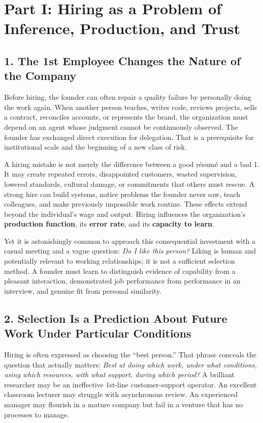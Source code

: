 \section*{Part I: Hiring as a Problem of Inference, Production, and Trust}

\subsection*{1. The 1st Employee Changes the Nature of the Company}

Before hiring, the founder can often repair a quality failure by personally doing the work again. When another person teaches, writes code, reviews projects, sells a contract, reconciles accounts, or represents the brand, the organization must depend on an agent whose judgment cannot be continuously observed. The founder has exchanged direct execution for delegation. That is a prerequisite for institutional scale and the beginning of a new class of risk.

A hiring mistake is not merely the difference between a good résumé and a bad 1. It may create repeated errors, disappointed customers, wasted supervision, lowered standards, cultural damage, or commitments that others must rescue. A strong hire can build systems, notice problems the founder never saw, teach colleagues, and make previously impossible work routine. These effects extend beyond the individual's wage and output. Hiring influences the organization's \textbf{production function}, its \textbf{error rate}, and its \textbf{capacity to learn}.

Yet it is astonishingly common to approach this consequential investment with a casual meeting and a vague question: \textit{Do I like this person?} Liking is human and potentially relevant to working relationships; it is not a sufficient selection method. A founder must learn to distinguish evidence of capability from a pleasant interaction, demonstrated job performance from performance in an interview, and genuine fit from personal similarity.

\subsection*{2. Selection Is a Prediction About Future Work Under Particular Conditions}

Hiring is often expressed as choosing the ``best person.'' That phrase conceals the question that actually matters: \textit{Best at doing which work, under what conditions, using which resources, with what support, during which period?} A brilliant researcher may be an ineffective 1st-line customer-support operator. An excellent classroom lecturer may struggle with asynchronous review. An experienced manager may flourish in a mature company but fail in a venture that has no processes to manage.

